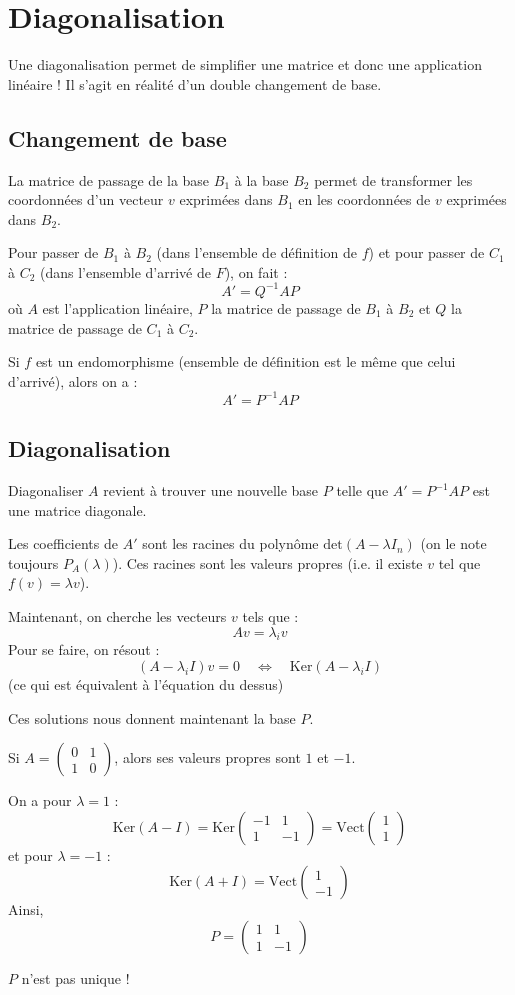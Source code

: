 \documentclass[a4paper, titlepage]{article}
\begin{document}
	\section{Diagonalisation}
	Une diagonalisation permet de simplifier une matrice et donc une application linéaire ! Il s'agit en réalité d'un double changement de base.
	\subsection{Changement de base}
	La matrice de passage de la base $B_1$ à la base $B_2$ permet de transformer les coordonnées d'un vecteur $v$ exprimées dans $B_1$ en les coordonnées de $v$ exprimées dans $B_2$.

	Pour passer de $B_1$ à $B_2$ (dans l'ensemble de définition de $f$) et pour passer de $C_1$ à $C_2$ (dans l'ensemble d'arrivé de $F$), on fait :
	$$ A' = Q^{-1}AP $$
	où $A$ est l'application linéaire, $P$ la matrice de passage de $B_1$ à $B_2$ et $Q$ la matrice de passage de $C_1$ à $C_2$.

	Si $f$ est un endomorphisme (ensemble de définition est le même que celui d'arrivé), alors on a :
	$$ A' = P^{-1}AP $$
	\subsection{Diagonalisation}
	Diagonaliser $A$ revient à trouver une nouvelle base $P$ telle que $A'=P^{-1}AP$ est une matrice diagonale.

	Les coefficients de $A'$ sont les racines du polynôme $\mathrm{det}(A-\lambda I_n)$ (on le note toujours $P_A(\lambda)$). Ces racines sont les valeurs propres (i.e. il existe $v$ tel que $f(v)=\lambda v$).

	Maintenant, on cherche les vecteurs $v$ tels que :
	$$ Av=\lambda_iv $$
	Pour se faire, on résout :
	$$ (A-\lambda_iI)v = 0 \quad\iff\quad\mathrm{Ker}(A-\lambda_iI)$$
	(ce qui est équivalent à l'équation du dessus)
	
	Ces solutions nous donnent maintenant la base $P$.
	\begin{exemple}
		Si $A = \begin{pmatrix} 0&1\\1&0 \end{pmatrix}$, alors ses valeurs propres sont $1$ et $-1$.

		On a pour $\lambda=1$ :
		$$\mathrm{Ker}(A-I) = \mathrm{Ker}\begin{pmatrix} -1&1\\1&-1 \end{pmatrix} = \mathrm{Vect}\begin{pmatrix} 1\\1 \end{pmatrix}$$
		et pour $\lambda=-1$ :
		$$\mathrm{Ker}(A+I) = \mathrm{Vect}\begin{pmatrix} 1\\-1 \end{pmatrix}$$
		Ainsi,
		$$ P = \begin{pmatrix} 1&1\\1&-1 \end{pmatrix}  $$
	\end{exemple}
	$P$ n'est pas unique !
\end{document}
